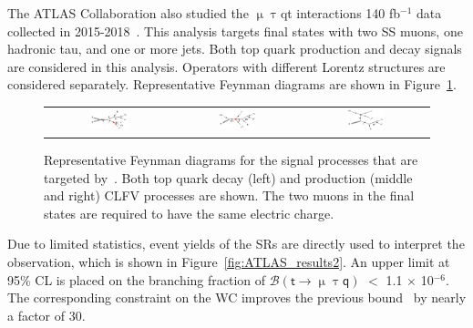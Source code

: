 The \ac{ATLAS} Collaboration also studied the $\upmu\uptau$qt interactions 140 fb$^{-1}$ data collected in 2015-2018~\cite{ATLAS-CONF-2023-001}. This analysis targets final states with two \ac{SS} muons, one hadronic tau, and one or more jets. Both top quark production and decay signals are considered in this analysis. Operators with different Lorentz structures are considered separately. Representative Feynman diagrams are shown in Figure~\ref{fig:ATLAS_FD}. 

\begin{figure}[tbh!]
 \begin{center}
 \begin{tabular}{ccc}
 \includegraphics[width=0.31\textwidth]{figures/Part3/History/ATLAS_TT}&
 \includegraphics[width=0.33\textwidth]{figures/Part3/History/ATLAS_ST1}&
 \includegraphics[width=0.31\textwidth]{figures/Part3/History/ATLAS_ST2}\\
 \end{tabular}
 \caption{Representative Feynman diagrams for the signal processes that are targeted by~\cite{ATLAS-CONF-2023-001}. Both top quark decay (left) and production (middle and right) \ac{CLFV} processes are shown. The two muons in the final states are required to have the same electric charge.}
 \label{fig:ATLAS_FD}
 \end{center}
\end{figure}

Due to limited statistics, event yields of the \acp{SR} are directly used to interpret the observation, which is shown in Figure~\ref{fig:ATLAS_results2}. An upper limit at 95\% \ac{CL} is placed on the branching fraction of $\mathcal{B}(\textsf{t}\rightarrow\upmu\uptau\textsf{q})$ $<$ 1.1 $\times$ 10$^{-6}$. The corresponding constraint on the \ac{WC} improves the previous bound~\cite{Chala:2018agk} by nearly a factor of 30.

